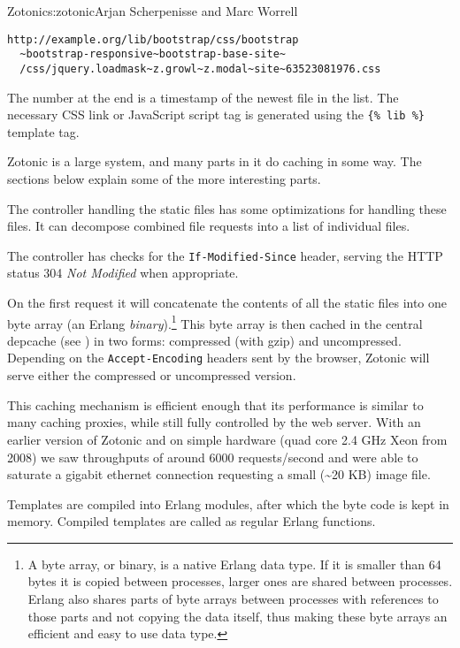 \begin{aosachapter}{Zotonic}{s:zotonic}{Arjan Scherpenisse and Marc Worrell}
\begin{verbatim}
http://example.org/lib/bootstrap/css/bootstrap
  ~bootstrap-responsive~bootstrap-base-site~
  /css/jquery.loadmask~z.growl~z.modal~site~63523081976.css
\end{verbatim}

\noindent The number at the end is a timestamp of the newest file in the list. The
necessary CSS link or JavaScript script tag is generated using the
\texttt{\{\% lib \%\}} template tag.


Zotonic is a large system, and many parts in it do caching in some way.
The sections below explain some of the more interesting parts.


The controller handling the static files has some optimizations for
handling these files. It can decompose combined file requests into a
list of individual files.

The controller has checks for the \texttt{If-Modified-Since} header,
serving the HTTP status 304 \emph{Not Modified} when appropriate.

On the first request it will concatenate the contents of all the static
files into one byte array (an Erlang \emph{binary}).\footnote{A byte
  array, or binary, is a native Erlang data type. If it is smaller than
  64 bytes it is copied between processes, larger ones are shared
  between processes. Erlang also shares parts of byte arrays between
  processes with references to those parts and not copying the data
  itself, thus making these byte arrays an efficient and easy to use
  data type.} This byte array is then cached in the central depcache
(see ) in two forms: compressed (with
gzip) and uncompressed. Depending on the \texttt{Accept-Encoding}
headers sent by the browser, Zotonic will serve either the compressed or
uncompressed version.

This caching mechanism is efficient enough that its performance is
similar to many caching proxies, while still fully controlled by the web
server. With an earlier version of Zotonic and on simple hardware (quad
core 2.4 GHz Xeon from 2008) we saw throughputs of around 6000
requests/second and were able to saturate a gigabit ethernet connection
requesting a small (\textasciitilde{}20 KB) image file.


Templates are compiled into Erlang modules, after which the byte code is
kept in memory. Compiled templates are called as regular Erlang
functions.


\end{aosachapter}
